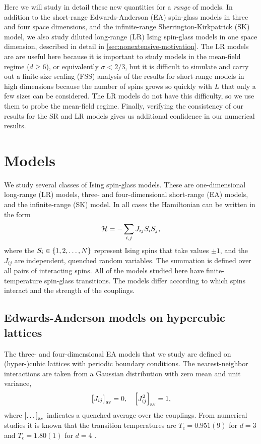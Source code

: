 Here we will study in detail these new quantities for a \emph{range} of models.
In addition to the short-range Edwards-Anderson (EA) spin-glass models in three
and four space dimensions, and the infinite-range Sherrington-Kirkpatrick (SK)
model, we also study diluted long-range (LR) Ising spin-glass models in one
space dimension, described in detail in \cref{sec:nonextensive-motivation}. The
LR models are are useful here because it is important to study models in the
mean-field regime ($d \geq 6$), or equivalently $\sigma < 2/3$, but it is
difficult to simulate and carry out a finite-size scaling (FSS) analysis of the
results for short-range models in high dimensions because the number of spins
grows so quickly with $L$ that only a few sizes can be considered. The LR
models do not have this difficulty, so we use them to probe the mean-field
regime. Finally, verifying the consistency of our results for the SR and LR
models gives us additional confidence in our numerical results.


\section{Models}
\label{sec:overlap-models}

We study several classes of Ising spin-glass models. These are one-dimensional
long-range (LR) models, three- and four-dimensional short-range (EA) models,
and the infinite-range (SK) model. In all cases the Hamiltonian can be written
in the form
\begin{equation}
  \mathcal{H} = -\sum_{i,j} J_{ij} S_i S_j,
\end{equation}
where the $S_i \in \cbr{1,2,\dots,N}$ represent Ising spins that take values
$\pm 1$, and the $J_{ij}$ are independent, quenched
random variables. The summation is defined over all pairs of interacting spins.
All of the models studied here have finite-temperature spin-glass transitions.
The models differ according to which spins interact and the strength of the
couplings.


\subsection{Edwards-Anderson models on hypercubic lattices}

The three- and four-dimensional EA models that we study are defined on
(hyper-)cubic lattices with periodic boundary conditions. The nearest-neighbor
interactions are taken from a Gaussian distribution with zero mean and unit
variance,
\begin{equation}
  \left[J_{ij}\right]_{\mathrm{av}}=0,\quad
  \left[J_{ij}^2\right]_{\mathrm{av}}=1,
\end{equation}
where $\left[\dots\right]_{\mathrm{av}}$ indicates a quenched average over the couplings.
From numerical studies it is known that the transition temperatures are
$T_c=0.951(9)$ for $d=3$ \autocite{katzgraber2006universality}
and $T_c=1.80(1)$ for $d=4$ \autocite{parisi1996equilibrium}.


